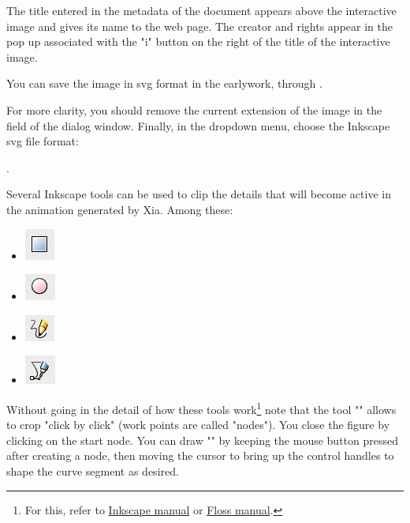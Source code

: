 The title entered in the metadata of the document appears above 
the interactive image and gives its name to the web page. The creator and 
 rights appear in the pop up associated with the "i" button 
on the right of the title of the interactive image.

You can save the image in svg format in the earlywork, 
through  .

For more clarity, you should remove the current extension of the image 
in the field  of the dialog window. Finally, in the 
dropdown menu, choose the Inkscape svg file format:

.

Several Inkscape tools can be used to clip the details that
will become active in the animation generated by Xia. Among these:
\begin{itemize}
 \item \includegraphics[scale=0.5]{./images/rec_carre} 
 \item \includegraphics[scale=0.5]{./images/cercles} 
 \item \includegraphics[scale=0.5]{./images/lignes} 
 \item \includegraphics[scale=0.5]{./images/bezier} 
\end{itemize}

Without going in the detail of how these tools work\footnote{For this, 
refer to \href{http://inkscape.org/doc/shapes/tutorial-shapes.fr.html}{Inkscape manual} or \href{http://en.flossmanuals.net/inkscape/}{Floss manual}.} note that the tool "" 
allows to crop "click by click" (work points are called 
"nodes").  You close the figure by clicking on the start node. 
You can draw "" by keeping the mouse button pressed 
after creating a node, then moving the cursor to bring up the control handles 
to shape the curve segment as desired.


